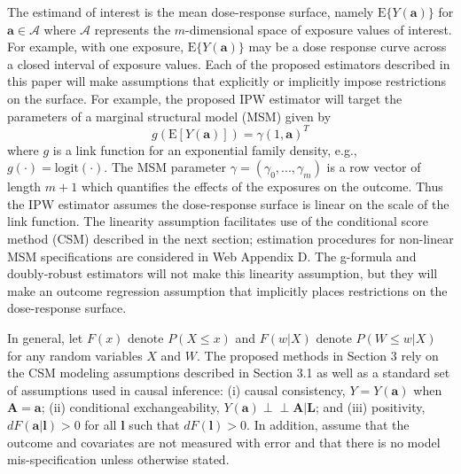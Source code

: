 \documentclass[useAMS,usenatbib,referee]{biom}
\begin{document}
The estimand of interest is the mean dose-response surface, namely $\text{E}\{ Y(\bm{a}) \}$ for $\bm{a} \in \bm{\mathcal{A}}$ where $\bm{\mathcal{A}}$ represents the $m$-dimensional space of exposure values of interest. For example, with one exposure, $\text{E}\{ Y(\bm{a}) \}$ may be a dose response curve across a closed interval of exposure values. Each of the proposed estimators described in this paper will make assumptions that explicitly or implicitly impose restrictions on the surface. For example, the proposed IPW estimator will target the parameters of a marginal structural model (MSM) given by
\begin{equation}
    g(\text{E}[Y(\bm{a})]) = \gamma (1, \bm{a})^{T}
\end{equation}
where $g$ is a link function for an exponential family density, e.g., $g(\cdot) = \text{logit}(\cdot)$. The MSM parameter $\gamma = (\gamma_{0}, ..., \gamma_{m})$ is a row vector of length $m+1$ which quantifies the effects of the exposures on the outcome. Thus the IPW estimator assumes the dose-response surface is linear on the scale of the link function. The linearity assumption facilitates use of the conditional score method (CSM) described in the next section; estimation procedures for non-linear MSM specifications are considered in Web Appendix D. The g-formula and doubly-robust estimators will not make this linearity assumption, but they will make an outcome regression assumption that implicitly places restrictions on the dose-response surface.

In general, let $F(x)$ denote $P(X \leq x)$ and $F(w | X)$ denote $P(W \leq w | X)$ for any random variables $X$ and $W$. The proposed methods in Section 3 rely on the CSM modeling assumptions described in Section 3.1 as well as a standard set of assumptions used in causal inference: (i) causal consistency, $Y = Y(\bm{a})$ when $\bm{A} = \bm{a}$; (ii) conditional exchangeability, $Y(\bm{a}) \perp \!\!\! \perp \bm{A} | \bm{L}$; and (iii) positivity, $dF(\bm{a} | \bm{l}) > 0$ for all $\bm{l}$ such that $dF(\bm{l}) > 0$. In addition, assume that the outcome and covariates are not measured with error and that there is no model mis-specification unless otherwise stated.
\end{document}
